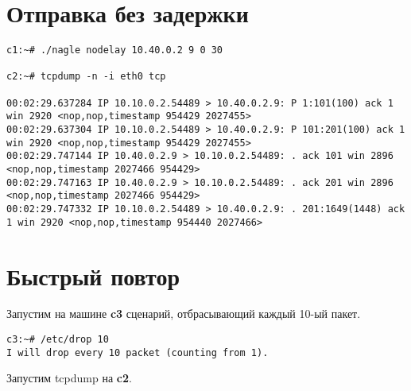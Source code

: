 \documentclass[a4paper,12pt]{article}
\begin{document}
\section{Отправка без задержки}

\begin{lstlisting}
c1:~# ./nagle nodelay 10.40.0.2 9 0 30

c2:~# tcpdump -n -i eth0 tcp

00:02:29.637284 IP 10.10.0.2.54489 > 10.40.0.2.9: P 1:101(100) ack 1 win 2920 <nop,nop,timestamp 954429 2027455>
00:02:29.637304 IP 10.10.0.2.54489 > 10.40.0.2.9: P 101:201(100) ack 1 win 2920 <nop,nop,timestamp 954429 2027455>
00:02:29.747144 IP 10.40.0.2.9 > 10.10.0.2.54489: . ack 101 win 2896 <nop,nop,timestamp 2027466 954429>
00:02:29.747163 IP 10.40.0.2.9 > 10.10.0.2.54489: . ack 201 win 2896 <nop,nop,timestamp 2027466 954429>
00:02:29.747332 IP 10.10.0.2.54489 > 10.40.0.2.9: . 201:1649(1448) ack 1 win 2920 <nop,nop,timestamp 954440 2027466>
\end{lstlisting}

\section{Быстрый повтор}

Запустим на машине \textbf{c3} сценарий, отбрасывающий каждый 10-ый пакет.

\begin{lstlisting}
c3:~# /etc/drop 10
I will drop every 10 packet (counting from 1).
\end{lstlisting}

Запустим tcpdump на \textbf{c2}.
\end{document}
